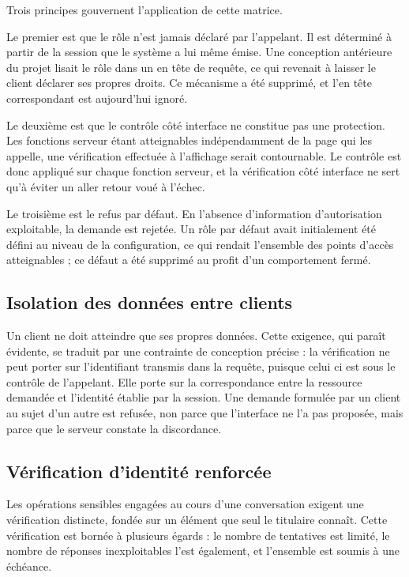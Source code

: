 Trois principes gouvernent l'application de cette matrice.

Le premier est que le rôle n'est jamais déclaré par l'appelant. Il est déterminé à partir de la session que le système a lui même émise. Une conception antérieure du projet lisait le rôle dans un en tête de requête, ce qui revenait à laisser le client déclarer ses propres droits. Ce mécanisme a été supprimé, et l'en tête correspondant est aujourd'hui ignoré.

Le deuxième est que le contrôle côté interface ne constitue pas une protection. Les fonctions serveur étant atteignables indépendamment de la page qui les appelle, une vérification effectuée à l'affichage serait contournable. Le contrôle est donc appliqué sur chaque fonction serveur, et la vérification côté interface ne sert qu'à éviter un aller retour voué à l'échec.

Le troisième est le refus par défaut. En l'absence d'information d'autorisation exploitable, la demande est rejetée. Un rôle par défaut avait initialement été défini au niveau de la configuration, ce qui rendait l'ensemble des points d'accès atteignables ; ce défaut a été supprimé au profit d'un comportement fermé.

\subsection{Isolation des données entre clients}

Un client ne doit atteindre que ses propres données. Cette exigence, qui paraît évidente, se traduit par une contrainte de conception précise : la vérification ne peut porter sur l'identifiant transmis dans la requête, puisque celui ci est sous le contrôle de l'appelant. Elle porte sur la correspondance entre la ressource demandée et l'identité établie par la session. Une demande formulée par un client au sujet d'un autre est refusée, non parce que l'interface ne l'a pas proposée, mais parce que le serveur constate la discordance.

\subsection{Vérification d'identité renforcée}

Les opérations sensibles engagées au cours d'une conversation exigent une vérification distincte, fondée sur un élément que seul le titulaire connaît. Cette vérification est bornée à plusieurs égards : le nombre de tentatives est limité, le nombre de réponses inexploitables l'est également, et l'ensemble est soumis à une échéance.

